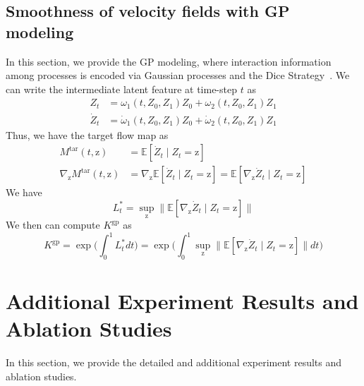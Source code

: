 \documentclass{article}
\begin{document}
\subsection{Smoothness of velocity fields with GP modeling}
\label{appendix:smoothness_gp}
In this section, we provide the GP modeling, where interaction information among processes is encoded via Gaussian processes and the Dice Strategy~\cite{xiao2023coupled}. We can write the intermediate latent feature at time-step $t$ as 
\begin{align}
    Z_t &= \omega_{1}(t, Z_0, Z_1) Z_0 + \omega_2(t, Z_0, Z_1) Z_1 \\
    \dot{Z}_{t} &=  \dot{\omega}_{1}(t, Z_0, Z_1) Z_0 + \dot{\omega}_2(t, Z_0, Z_1) Z_1
\end{align}
Thus, we have the target flow map as 
\begin{align}
    M^{\text{tar}}(t, \mathrm{z}) &= \mathbb{E}[\dot{Z}_t \mid Z_t = \mathrm{z}] \\
    \nabla_{\mathrm{z}}M^{\text{tar}}(t, \mathrm{z}) &= \nabla_{\mathrm{z}} \mathbb{E}[\dot{Z}_t \mid Z_t = \mathrm{z}] = \mathbb{E}[\nabla_{\mathrm{z}}  \dot{Z}_t \mid Z_t = \mathrm{z}]
\end{align}
We have 
\begin{equation}
    L^*_t = \sup_{\mathrm{z}} \|\mathbb{E}[\nabla_{\mathrm{z}}  \dot{Z}_t \mid Z_t = \mathrm{z}] \|
\end{equation}
We then can compute $K^{\text{gp}}$ as 
\begin{equation}
    K^{\text{gp}} = \exp \Big(\int_{0}^{1} L^*_t dt \Big) = \exp \Big(\int_{0}^{1}  \sup_{\mathrm{z}} \|\mathbb{E}[\nabla_{\mathrm{z}}  \dot{Z}_t \mid Z_t = \mathrm{z}] \| dt \Big)
\end{equation}
\section{Additional Experiment Results and Ablation Studies}
\label{appendix:Experiment_detailed_results}
In this section, we provide the detailed and additional experiment results and ablation studies. 
\end{document}
